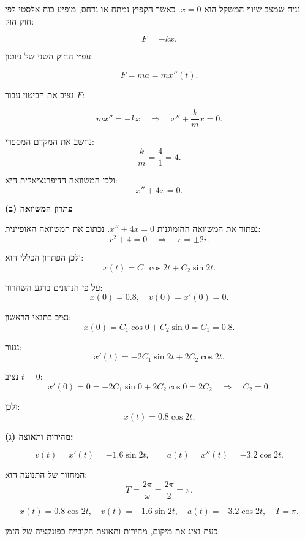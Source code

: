 \documentclass{article}
\numberwithin{equation}{section}
\begin{document}
נניח שמצב שיווי המשקל הוא \( x=0 \).  
כאשר הקפיץ נמתח או נדחס, מופיע כוח אלסטי לפי חוק הוק:

\[
F = -kx.
\]

עפ״י החוק השני של ניוטון:

\[
F = ma = m x''(t).
\]

נציב את הביטוי עבור \( F \):

\[
m x'' = -kx \quad \Longrightarrow \quad x'' + \frac{k}{m}x = 0.
\]

נחשב את המקדם המספרי:  
\[
\frac{k}{m} = \frac{4}{1} = 4.
\]

ולכן המשוואה הדיפרנציאלית היא:
\[
\boxed{x'' + 4x = 0.}
\]

\textbf{(ב) פתרון המשוואה}

נפתור את המשוואה ההומוגנית \( x'' + 4x = 0 \).  
נכתוב את המשוואה האופיינית:
\[
r^2 + 4 = 0 \quad \Longrightarrow \quad r = \pm 2i.
\]

ולכן הפתרון הכללי הוא:
\[
x(t) = C_1 \cos 2t + C_2 \sin 2t.
\]

על פי הנתונים ברגע השחרור:
\[
x(0) = 0.8, \quad v(0) = x'(0) = 0.
\]

נציב בתנאי הראשון:
\[
x(0) = C_1 \cos 0 + C_2 \sin 0 = C_1 = 0.8.
\]

נגזור:
\[
x'(t) = -2C_1 \sin 2t + 2C_2 \cos 2t.
\]

נציב \( t=0 \):
\[
x'(0) = 0 = -2C_1 \sin 0 + 2C_2 \cos 0 = 2C_2 \quad \Longrightarrow \quad C_2 = 0.
\]

ולכן:
\[
\boxed{x(t) = 0.8 \cos 2t.}
\]

\textbf{(ג) מהירות ותאוצה:}

\[
v(t) = x'(t) = -1.6 \sin 2t,
\qquad
a(t) = x''(t) = -3.2 \cos 2t.
\]

המחזור של התנועה הוא:
\[
T = \frac{2\pi}{\omega} = \frac{2\pi}{2} = \pi.
\]

\[
\boxed{
x(t) = 0.8\cos 2t, \quad 
v(t) = -1.6\sin 2t, \quad 
a(t) = -3.2\cos 2t, \quad 
T = \pi.
}
\]

כעת נציג את מיקום, מהירות ותאוצת הקובייה כפונקציה של הזמן:
\end{document}
